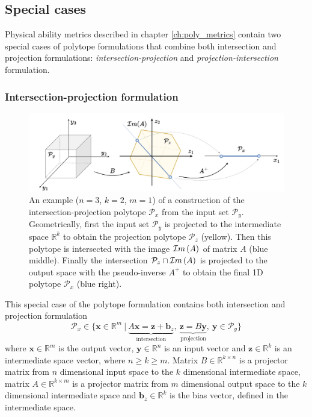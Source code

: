 \subsection{Special cases}
\label{ch:combined_forms}
Physical ability metrics described in chapter \ref{ch:poly_metrics} contain two special cases of polytope formulations that combine both intersection and projection formulations: \textit{intersection-projection} and \textit{projection-intersection} formulation.


\subsubsection{Intersection-projection formulation}
\begin{figure}
    \centering
    \includegraphics[width=\linewidth]{Chapters/imgs/spec_int_proj.pdf}
    \caption{An example ($n=3$, $k=2$, $m=1$) of a construction of the intersection-projection polytope $\mathcal{P}_x$ from the input set $\mathcal{P}_y$. Geometrically, first the input set $\mathcal{P}_y$ is projected to the intermediate space $\mathbb{R}^k$ to obtain the projection polytope $\mathcal{P}_z$ (yellow). Then this polytope is intersected with the image $\mathcal{I}m\left(A\right)$ of matrix $A$ (blue middle). Finally the intersection $\mathcal{P}_z\cap\mathcal{I}m\left(A\right)$ is projected to the output space with the pseudo-inverse $A^+$ to obtain the final 1D polytope $\mathcal{P}_x$ (blue right).}
    \label{fig:inter_proj_spec}
\end{figure}

This special case of the polytope formulation contains both intersection and projection formulation
\begin{equation}
    \mathcal{P}_x \in \{\bm{x}\in \mathbb{R}^m~|~\underbrace{A \bm{x}= \bm{z}+ \bm{b}_z}_{\text{intersection}},~ \underbrace{ \bm{z}=B \bm{y}}_{\text{projection}} ,~ \bm{y} \in \mathcal{P}_y\} 
    \label{eq:inter_proj_poly}
\end{equation}
where $\bm{x}\in\mathbb{R}^m$ is the output vector, $\bm{y} \in \mathbb{R}^n$ is an input vector and $\bm{z}\in\mathbb{R}^k$ is an intermediate space vector, where $n\!\geq\!k\!\geq\!m$. Matrix $B\in \mathbb{R}^{k \times n}$ is a projector matrix from $n$ dimensional input space to the $k$ dimensional intermediate space, matrix $A\in \mathbb{R}^{k\times m}$ is a projector matrix from $m$ dimensional output space to the $k$ dimensional intermediate space and $\bm{b}_z\in\mathbb{R}^k$ is the bias vector, defined in the intermediate space.

